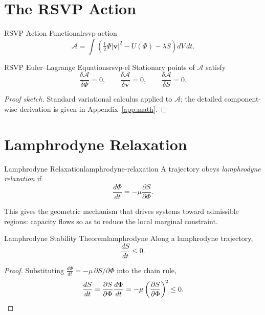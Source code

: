 \documentclass[12pt,twoside,openright]{book}
\begin{document}
\section{The RSVP Action}
\label{sec:ch16-action}

\begin{definition}{RSVP Action Functional}{rsvp-action}
  \[
    \mathcal{A}
    = \int \left(
        \tfrac{1}{2}\Phi|\mathbf{v}|^2
        - U(\Phi)
        - \lambda S
      \right) dV \, dt.
  \]
\end{definition}

\begin{theorem}{RSVP Euler--Lagrange Equations}{rsvp-el}
  Stationary points of $\mathcal{A}$ satisfy
  \[
    \frac{\delta\mathcal{A}}{\delta\Phi} = 0,
    \qquad
    \frac{\delta\mathcal{A}}{\delta\mathbf{v}} = 0,
    \qquad
    \frac{\delta\mathcal{A}}{\delta S} = 0.
  \]
\end{theorem}

\begin{proof}[Proof sketch]
  Standard variational calculus applied to $\mathcal{A}$;
  the detailed component-wise derivation is given in
  Appendix~\ref{app:math}.
\end{proof}

\section{Lamphrodyne Relaxation}
\label{sec:ch16-lamphrodyne}

\begin{definition}{Lamphrodyne Relaxation}{lamphrodyne-relaxation}
  A trajectory obeys \emph{lamphrodyne relaxation} if
  \[
    \frac{d\Phi}{dt}
    = -\mu \frac{\partial S}{\partial \Phi}.
  \]
\end{definition}

This gives the geometric mechanism that drives systems
toward admissible regions: capacity flows so as to reduce
the local marginal constraint.

\begin{theorem}{Lamphrodyne Stability Theorem}{lamphrodyne}
  Along a lamphrodyne trajectory,
  \[
    \frac{dS}{dt} \le 0.
  \]
\end{theorem}

\begin{proof}
  Substituting $\frac{d\Phi}{dt} = -\mu\,\partial S/\partial\Phi$
  into the chain rule,
  \[
    \frac{dS}{dt}
    = \frac{\partial S}{\partial \Phi}\frac{d\Phi}{dt}
    = -\mu \left(\frac{\partial S}{\partial \Phi}\right)^{\!2}
    \le 0. \qedhere
  \]
\end{proof}
\end{document}
